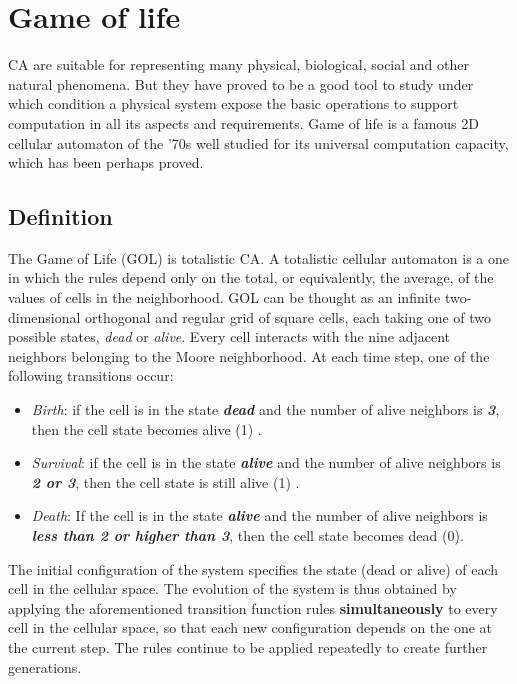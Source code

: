 \section{Game of life}
\label{sect:GOL}
CA are suitable for representing many physical, biological, social and other
natural phenomena.
But they have proved to be a good tool to study under which condition a
physical system expose the basic operations 
to  support computation in all its aspects and requirements. Game of life is a famous 2D
cellular automaton of the '70s well studied for its universal
computation capacity, which has been perhaps proved.

\subsection{Definition} 
The Game of Life (GOL) is totalistic CA.
A totalistic cellular automaton is a one in which the rules depend only on the total, or equivalently, the average, of the values of cells in the neighborhood. 
GOL can be thought as an infinite two-dimensional orthogonal and regular grid of square cells, each taking one of two possible states, \emph{dead} or \emph{alive}.
Every cell interacts with the nine adjacent neighbors belonging to the Moore neighborhood. At each time step, one of the following transitions occur:
	\begin{itemize}
	\item \emph{Birth}: if the cell is in the state \textbf{\textit{dead}} and
	the number of alive neighbors is \textbf{\textit{3}}, then the cell state
	becomes alive (1) .
	\item \emph{Survival}: if the cell is in the state \textbf{\textit{alive}}
	and the number of alive neighbors is \textbf{\textit{2 or 3}}, then the cell
	state is still alive (1) .
	\item \emph{Death}: If the cell is in the state \textbf{\textit{alive}} and
	the number of alive neighbors is \textbf{\textit{less than 2 or higher
			than 3}}, then the cell state becomes dead (0).
\end{itemize}
The initial configuration of the system specifies the state (dead
or alive) of each cell in the cellular space. The evolution of the
system is thus obtained by applying the aforementioned transition function rules \textbf{simultaneously} to every cell in
the cellular space, so that each new configuration depends on the
one at the current step. The rules continue to be applied
repeatedly to create further generations.

